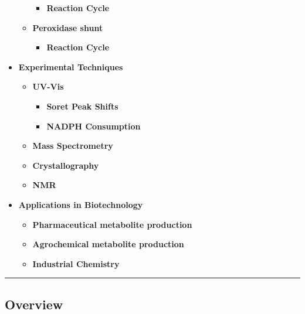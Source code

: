 \begin{itemize}
\begin{itemize}
    \begin{itemize}
    \tightlist
    \item
      \textbf{Reaction Cycle}
    \end{itemize}
  \item
    \textbf{Peroxidase shunt}

    \begin{itemize}
    \tightlist
    \item
      \textbf{Reaction Cycle}
    \end{itemize}
  \end{itemize}
\item
  \textbf{Experimental Techniques}

  \begin{itemize}
  \tightlist
  \item
    \textbf{UV-Vis}

    \begin{itemize}
    \tightlist
    \item
      \textbf{Soret Peak Shifts}
    \item
      \textbf{NADPH Consumption}
    \end{itemize}
  \item
    \textbf{Mass Spectrometry}
  \item
    \textbf{Crystallography}
  \item
    \textbf{NMR}
  \end{itemize}
\item
  \textbf{Applications in Biotechnology}

  \begin{itemize}
  \tightlist
  \item
    \textbf{Pharmaceutical metabolite production}
  \item
    \textbf{Agrochemical metabolite production}
  \item
    \textbf{Industrial Chemistry}
  \end{itemize}
\end{itemize}

\begin{center}\rule{0.5\linewidth}{0.5pt}\end{center}

\hypertarget{overview}{%
\subsection{Overview}\label{overview}}

